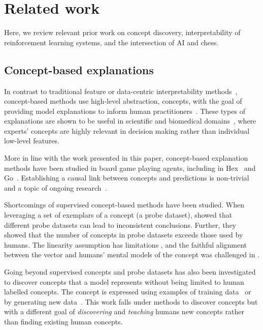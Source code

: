 \documentclass{article}
\begin{document}
\section{Related work} \label{sec:related_work}

Here, we review relevant prior work on concept discovery, interpretability of reinforcement learning systems, and the intersection of AI and chess.

\subsection{Concept-based explanations}

In contrast to traditional feature or data-centric interpretability methods~\citep{ribeiro2016should,lundberg2017unified, integrated-gradients, koh2017understanding}, concept-based methods use high-level abstraction, concepts, with the goal of providing model explanations to inform human practitioners~\citep{bau2017network,kim2018interpretability,melis2018towards, koh2020concept, bai2022concept, achtibat2022where, NEURIPS2022_11a7f429}.
These types of explanations are shown to be useful in scientific and biomedical domains~\citep{graziani2018regression, sprague2018interpretable, clough2019global, bouchacourt2019educe, yeche2019ubs, sreedharan2020bridging, schwalbe2020concept, mincu2021concept, jia2022role}, where experts' concepts are highly relevant in decision making rather than individual low-level features.

More in line with the work presented in this paper, concept-based explanation methods have been studied in board game playing agents, including in Hex~\citep{forde2022concepts} and Go~\citep{tomlin2022understanding}. Establishing a causal link between concepts and predictions is non-trivial and a topic of ongoing research~\citep{goyal2019explaining, Bahadori2020, wu2023causal}.


Shortcomings of supervised concept-based methods have been studied. 
When leveraging a set of exemplars of a concept (a probe dataset), 
\cite{Ramaswamy_2023_CVPR} showed that different probe datasets can lead to inconsistent conclusions. Further, they showed that the number of concepts in probe datasets exceeds those used by humans. The linearity assumption has limitations \citep{chen2020concept, soni2020adversarial}, and the faithful alignment between the vector and humans' mental models of the concept was challenged in \cite{pitfalls21}. 

Going beyond supervised concepts and probe datasets has also been investigated~\citep{yeh2020completeness, ghorbani2019towards, ghandeharioun2021dissect} to discover concepts that a model represents without being limited to human labelled concepts. The concept is expressed using examples of training data~\citep{yeh2020completeness, ghorbani2019towards} or by generating new data~\citep{ghandeharioun2021dissect}. This work falls under methods to discover concepts but with a different goal of \textit{discovering} and \textit{teaching} humans new concepts rather than finding existing human concepts. 
\end{document}

